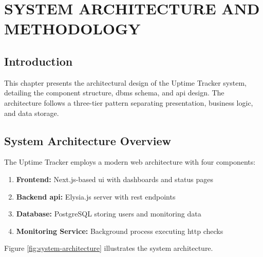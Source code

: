 \chapter{SYSTEM ARCHITECTURE AND METHODOLOGY}

\section{Introduction}

This chapter presents the architectural design of the Uptime Tracker system, detailing the component structure, \gls{dbms} schema, and \gls{api} design. The architecture follows a three-tier pattern separating presentation, business logic, and data storage.

\section{System Architecture Overview}

The Uptime Tracker employs a modern web architecture with four components:

\begin{enumerate}
    \item \textbf{Frontend:} Next.js-based \gls{ui} with dashboards and status pages
    \item \textbf{Backend \gls{api}:} Elysia.js server with \gls{rest} endpoints
    \item \textbf{Database:} PostgreSQL storing users and monitoring data
    \item \textbf{Monitoring Service:} Background process executing \gls{http} checks
\end{enumerate}

Figure \ref{fig:system-architecture} illustrates the system architecture.

